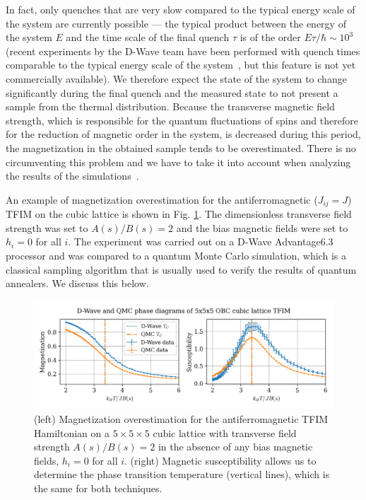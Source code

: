 \documentclass[12pt,a4paper]{article}
\begin{document}
In fact, only quenches that are very slow compared to the typical energy scale of the system are currently
possible --- the typical product between the energy of the system $E$ and the time scale of the final
quench $\tau$ is of the order $E \tau / \hbar \sim 10^3$ (recent experiments by the D-Wave team
have been performed with quench times comparable to the typical energy scale of the system~\cite{king2022coherent},
but this feature is not yet commercially available). We therefore expect the state of the system to change
significantly during the final quench and the measured state to not present a sample from the thermal distribution.
Because the transverse magnetic field strength, which is responsible for the quantum fluctuations of spins and
therefore for the reduction of magnetic order in the system, is decreased during this period, the magnetization
in the obtained sample tends to be overestimated. There is no circumventing this problem and
we have to take it into account when analyzing the results of the simulations~\cite*{king2021scaling}.

\hspace*{0.3cm}
An example of magnetization overestimation for the antiferromagnetic ($J_{ij} = J$) TFIM on the cubic lattice is shown in Fig.
\ref{fig:magnetization_overestimation}. The dimensionless transverse field strength was set to $A(s) / B(s) = 2$
and the bias magnetic fields were set to $h_i = 0$ for all $i$. The experiment was carried out on a D-Wave Advantage6.3
processor and was compared to a quantum Monte Carlo simulation, which is a classical sampling algorithm that
is usually used to verify the results of quantum annealers. We discuss this below.
\begin{figure}[!htb]
    \centering
    \includegraphics[width=\textwidth]{../plots/dwave_vs_mcmc-5x5x5_gamma2.png}
    \captionsetup{width=0.9\textwidth}
    \caption{(left) Magnetization overestimation for the antiferromagnetic TFIM Hamiltonian on a $5 \times 5 \times 5$
    cubic lattice with transverse field strength $A(s) / B(s) = 2$ in the absence of any bias magnetic fields, $h_i = 0$ for all $i$.
    (right) Magnetic susceptibility allows us to determine the phase transition temperature (vertical lines),
    which is the same for both techniques.}
    \label{fig:magnetization_overestimation}
\end{figure}
\end{document}
